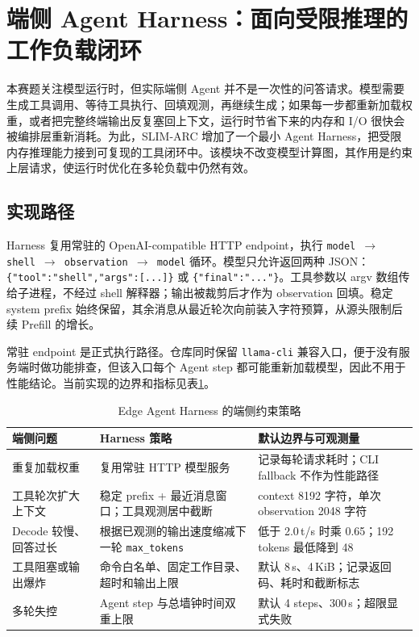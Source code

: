 \section{端侧 Agent Harness：面向受限推理的工作负载闭环}

本赛题关注模型运行时，但实际端侧 Agent 并不是一次性的问答请求。模型需要生成工具调用、等待工具执行、回填观测，再继续生成；如果每一步都重新加载权重，或者把完整终端输出反复塞回上下文，运行时节省下来的内存和 I/O 很快会被编排层重新消耗。为此，SLIM-ARC 增加了一个最小 Agent Harness，把受限内存推理能力接到可复现的工具闭环中。该模块不改变模型计算图，其作用是约束上层请求，使运行时优化在多轮负载中仍然有效。

\subsection{实现路径}

Harness 复用常驻的 OpenAI-compatible HTTP endpoint，执行 \texttt{model $\rightarrow$ shell $\rightarrow$ observation $\rightarrow$ model} 循环。模型只允许返回两种 JSON：\texttt{\{"tool":"shell","args":[...]\}} 或 \texttt{\{"final":"..."\}}。工具参数以 argv 数组传给子进程，不经过 shell 解释器；输出被裁剪后才作为 observation 回填。稳定 system prefix 始终保留，其余消息从最近轮次向前装入字符预算，从源头限制后续 Prefill 的增长。

常驻 endpoint 是正式执行路径。仓库同时保留 \texttt{llama-cli} 兼容入口，便于没有服务端时做功能排查，但该入口每个 Agent step 都可能重新加载模型，因此不用于性能结论。当前实现的边界和指标见表\ref{tab:agent-harness-policy}。

\begin{table}[H]
  \centering
  \small
  \caption{Edge Agent Harness 的端侧约束策略}
  \label{tab:agent-harness-policy}
  \begin{tabular}{p{}p{}p{}}
    \toprule
    端侧问题 & Harness 策略 & 默认边界与可观测量 \\
    \midrule
    重复加载权重
      & 复用常驻 HTTP 模型服务
      & 记录每轮请求耗时；CLI fallback 不作为性能路径 \\
    工具轮次扩大上下文
      & 稳定 prefix + 最近消息窗口；工具观测居中截断
      & context 8192 字符，单次 observation 2048 字符 \\
    Decode 较慢、回答过长
      & 根据已观测的输出速度缩减下一轮 \texttt{max\_tokens}
      & 低于 2.0\,t/s 时乘 0.65；192 tokens 最低降到 48 \\
    工具阻塞或输出爆炸
      & 命令白名单、固定工作目录、超时和输出上限
      & 默认 8\,s、4\,KiB；记录返回码、耗时和截断标志 \\
    多轮失控
      & Agent step 与总墙钟时间双重上限
      & 默认 4 steps、300\,s；超限显式失败 \\
    \bottomrule
  \end{tabular}
\end{table}


